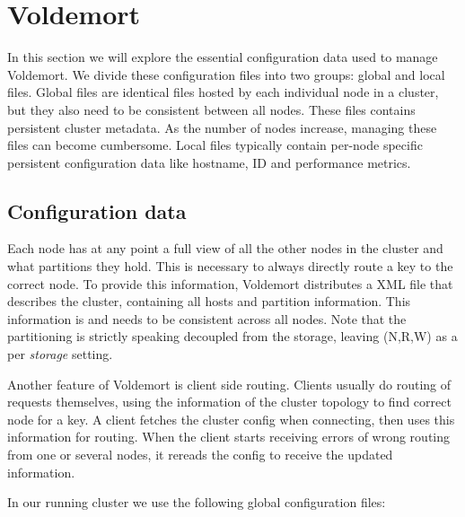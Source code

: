 

\section{Voldemort}
\label{sec:voldemort}
In this section we will explore the essential configuration data used to manage Voldemort. We divide these configuration files into two groups: global and local files. Global files are identical files hosted by each individual node in a cluster, but they also need to be consistent between all nodes. These files contains persistent cluster metadata. As the number of nodes increase, managing these files can become cumbersome. Local files typically contain per-node specific persistent configuration data like hostname, ID and performance metrics.

\subsection{Configuration data}
Each node has at any point a full view of all the other nodes in the cluster and what partitions they hold. This is necessary to always directly route a key to the correct node.
To provide this information, Voldemort distributes a XML file that describes the cluster, containing all hosts and partition information. This information is and needs to be consistent across all nodes.
Note that the partitioning is strictly speaking decoupled from the storage, leaving (N,R,W) as a per \emph{storage} setting.

Another feature of Voldemort is client side routing. Clients usually do routing of requests themselves, using the information of the cluster topology to find correct node for a key. A client fetches the cluster config when connecting, then uses this information for routing. When the client starts receiving errors of wrong routing from one or several nodes, it rereads the config to receive the updated information.

In our running cluster we use the following global configuration files:


